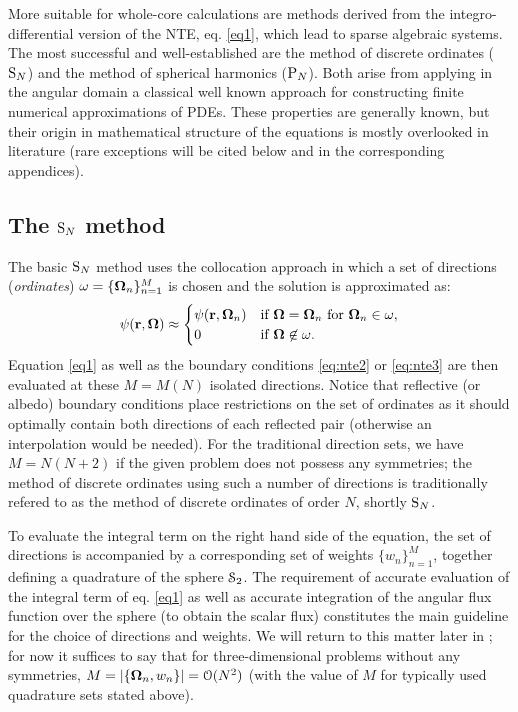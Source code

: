 \vspace*{1em}
More suitable for whole-core calculations are methods derived from the integro-differential
version of the NTE, eq.
\eqref{eq1}, which lead to sparse algebraic systems. The most successful and well-established are the method
of discrete ordinates ($\text{S}_{N}$) and the method of spherical harmonics ($\text{P}_{N}$).
Both arise from applying in the
angular domain a classical well known approach for constructing finite numerical
approximations of PDEs.  These properties are
generally known, but their origin in mathematical structure of the equations is mostly overlooked in
literature (rare exceptions will be cited below and in the corresponding appendices). 

\subsection{The $\text{S}_{N}$ method}\label{sec:1-SN}
The basic $\text{S}_{N}$ method uses the collocation approach in which a set of directions (\textit{ordinates})
$\omega = \{\mathbf{\Omega}_n\}_{n=1}^{M}$ is chosen and the solution is approximated as:
\begin{equation}\label{eq:sn_approx} 
	\psi(\mathbf{r}, \mathbf{\Omega}) \approx 
		\begin{cases}\displaystyle \psi(\mathbf{r},\mathbf{\Omega}_n) & \mbox{if $\mathbf{\Omega} = \mathbf{\Omega}_n$ for $\mathbf{\Omega}_n \in \omega$},\\ 0 & \mbox{if $\mathbf{\Omega} \not \in \omega$.} \end{cases} 
\end{equation}
Equation \eqref{eq1} as well as the boundary conditions \eqref{eq:nte2} or \eqref{eq:nte3} are then evaluated at these
$M = M(N)$ isolated directions. Notice that reflective (or albedo) boundary conditions place restrictions on the set of
ordinates as it should optimally contain both directions of each reflected pair (otherwise an interpolation would be
needed). For the traditional direction sets, we have $M = N(N+2)$ if the given problem does not possess any symmetries;
the method of discrete ordinates using such a number of directions is traditionally refered to as the method of 
discrete ordinates of order $N$, shortly $\text{S}_{N}$.

To evaluate the integral term on the right hand side of the equation, the set of directions is accompanied by a
corresponding set of weights $\{w_n\}_{n=1}^{M}$, together defining a quadrature of the sphere $\mathcal{S}_2$. The
requirement of accurate evaluation of the integral term of eq.
\eqref{eq1} as well as accurate integration of the angular flux function over the sphere (to obtain the scalar flux)
constitutes the main guideline for the choice of directions and weights. We will return to this matter later in 
; for now it suffices to say that for three-dimensional problems without any symmetries, \mbox{$M = \left|\{\mathbf{\Omega}_n, w_n\}\right| = \mathcal{O}(N^2)$} (with the
value of $M$ for typically used quadrature sets stated above).

